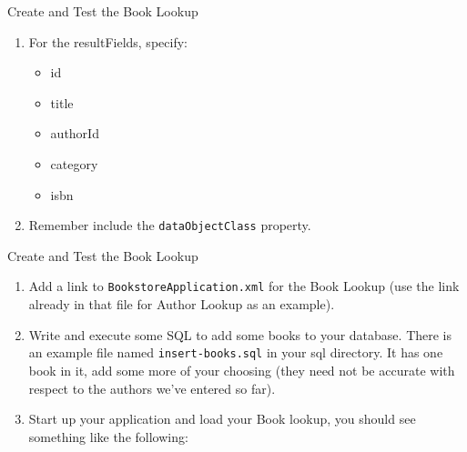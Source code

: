 \documentclass[xcolor=dvipsnames,14pt,professionalfonts]{beamer}
\begin{document}
        \begin{frame}{Create and Test the Book Lookup}
          \begin{enumerate}
          \item For the resultFields, specify:
            \begin{itemize}
              \item id
            \item title
            \item authorId
            \item category
            \item isbn
            \end{itemize}
          \item Remember include the \texttt{dataObjectClass} property.
            \end{enumerate}
          \end{frame}
          
          \begin{frame}{Create and Test the Book Lookup}
            \begin{enumerate}
              \item Add a link to \texttt{BookstoreApplication.xml} for the Book Lookup (use the link already in that file for Author Lookup as an example).
              \item Write and execute some SQL to add some books to your database.  There is an example file named \texttt{insert-books.sql} in your sql directory.  It has one book in it, add some more of your choosing (they need not be accurate with respect to the authors we’ve entered so far).
              \item Start up your application and load your Book
                lookup, you should see something like the following:
              \end{enumerate}
            \end{frame}
\end{document}
